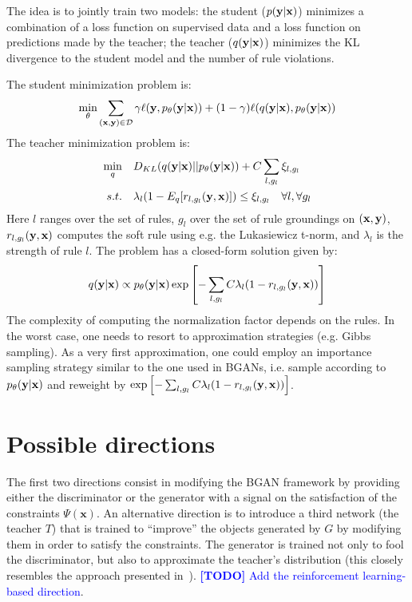 \documentclass{article}
\newcommand{\todo}[1]{\textcolor{blue}{{\bf [TODO]} #1}}
\begin{document}
The idea is to jointly train two models: the student ($p({\mathbf y}|{\mathbf x})$)
minimizes a combination of a loss function on supervised data and a
loss function on predictions made by the teacher; the teacher
($q({\mathbf y}|{\mathbf x})$) minimizes the KL divergence to the student model and the
number of rule violations.

\noindent The student minimization problem is:
\begin{align*}
  \min_\theta \sum_{({\mathbf x},{\mathbf y}) \in {\cal D}} \gamma \ell({\mathbf y},p_\theta({\mathbf y}|{\mathbf x})) + (1-\gamma) \ell(q({\mathbf y}|{\mathbf x}),p_\theta({\mathbf y}|{\mathbf x}))
\end{align*}
The teacher minimization problem is:
\begin{align*}
  \min_q & \quad D_{KL}(q({\mathbf y}|{\mathbf x})||p_\theta({\mathbf y}|{\mathbf x})) + C \sum_{l,g_l} \xi_{l,g_l}  \\
  s.t. &  \quad \lambda_l(1 - E_q[r_{l,g_l}({\mathbf y},{\mathbf x})]) \le \xi_{l,g_l} \quad \forall l, \forall g_l 
\end{align*}
Here $l$ ranges over the set of rules, $g_l$ over the set of rule
groundings on $({\mathbf x},{\mathbf y})$, $r_{l,g_l}({\mathbf y},{\mathbf x})$ computes the soft rule
using e.g. the Lukasiewicz t-norm, and $\lambda_l$ is the strength of
rule $l$. The problem has a closed-form solution given by:
$$
q({\mathbf y}|{\mathbf x}) \propto p_\theta({\mathbf y}|{\mathbf x}) \exp{\left[-\sum_{l,g_l} C \lambda_l (1 - r_{l,g_l}({\mathbf y},{\mathbf x}))\right]}
$$
The complexity of computing the normalization factor depends on the
rules. In the worst case, one needs to resort to approximation
strategies (e.g. Gibbs sampling). As a very first approximation, one
could employ an importance sampling strategy similar to the one
used in BGANs, i.e. sample according to $p_\theta({\mathbf y}|{\mathbf x})$ and reweight
by
$\exp{\left[-\sum_{l,g_l} C \lambda_l (1 - r_{l,g_l}({\mathbf y},{\mathbf x}))\right]}$.


\section{Possible directions}
The first two directions consist in modifying the BGAN framework by
providing either the discriminator or the generator with a signal on
the satisfaction of the constraints $\Psi(\mathbf{x})$. An alternative
direction is to introduce a third network (the teacher $T$) that is
trained to ``improve'' the objects generated by $G$ by modifying them
in order to satisfy the constraints. The generator is trained not only
to fool the discriminator, but also to approximate the teacher's
distribution (this closely resembles the approach presented
in~\cite{logicdeep}). \todo{Add the reinforcement learning-based direction}.
\end{document}
